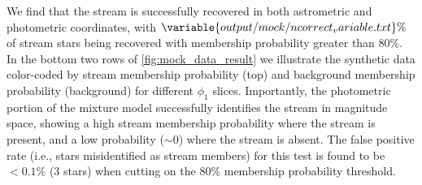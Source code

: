 \documentclass[twocolumn, linenumbers]{aastex631}
\begin{document}
        We find that the stream is successfully recovered in both astrometric
        and photometric coordinates, with
        $\variable{output/mock/ncorrect_variable.txt}\%$ 
        of stream stars being recovered with membership probability greater than
        $80\%$.  In the bottom two rows of \autoref{fig:mock_data_result} we
        illustrate the synthetic data color-coded by stream membership
        probability (top) and background membership probability (background) for
        different $\phi_1$ slices. Importantly, the photometric portion of the
        mixture model successfully identifies the stream in magnitude space,
        showing a high stream membership probability where the stream is
        present, and a low probability ($\sim 0$) where the stream is absent.
        The false positive rate (i.e., stars misidentified as stream members)
        for this test is found to be $<0.1\%$ (3 stars) when cutting on the 80\%
        membership probability threshold.
\end{document}
